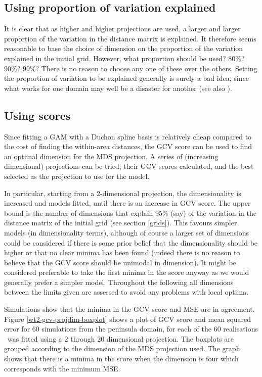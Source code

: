 \subsection{Using proportion of variation explained}

It is clear that as higher and higher projections are used, a larger and larger proportion of the variation in the distance matrix is explained. It therefore seems reasonable to base the choice of dimension on the proportion of the variation explained in the initial grid. However, what proportion should be used? 80\%? 90\%? 99\%? There is no reason to choose any one of these over the others. Setting the proportion of variation to be explained generally is surely a bad idea, since what works for one domain may well be a disaster for another (see also ).

\subsection{Using scores}

Since fitting a GAM with a Duchon spline basis is relatively cheap compared to the cost of finding the within-area distances, the GCV score can be used to find an optimal dimension for the MDS projection. A series of (increasing dimensional) projections can be tried, their GCV scores calculated, and the best selected as the projection to use for the model.

In particular, starting from a 2-dimensional projection, the dimensionality is increased and models fitted, until there is an increase in GCV score. The upper bound is the number of dimensions that explain 95\% (say) of the variation in the distance matrix of the initial grid (see section \ref{grids}).  This favours simpler models (in dimensionality terms), although of course a larger set of dimensions could be considered if there is some prior belief that the dimensionality should be higher or that no clear minima has been found (indeed there is no reason to believe that the GCV score should be unimodal in dimension). It might be considered preferable to take the first minima in the score anyway as we would generally prefer a simpler model. Throughout the following all dimensions between the limits given are assessed to avoid any problems with local optima.

Simulations show that the minima in the GCV score and MSE are in agreement. Figure \ref{wt2-gcv-projdim-boxplot} shows a plot of GCV score and mean squared error for 60 simulations from the peninsula domain, for each of the 60 realisations \mdsds\ was fitted using a 2 through 20 dimensional projection. The boxplots are grouped according to the dimension of the MDS projection used. The graph shows that there is a minima in the score when the dimension is four which corresponds with the minimum MSE.

